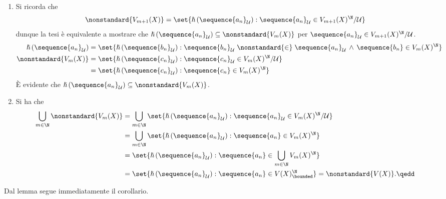 {\begin{enumerate}
        \item Si ricorda che \begin{equation*}
            \nonstandard{V_{m+1}(X) } = \set{\hslash\left(\sequence{a_{n} }_{\mathcal{U}}\right) : \sequence{a_{n} }_{\mathcal{U}} \in V_{m+1}(X)^{\N}/\mathcal{U} }
        \end{equation*}dunque la tesi è equivalente a mostrare che $ \hslash\left(\sequence{a_{n} }_{\mathcal{U}}\right) \subseteq \nonstandard{V_{m}(X) } $ per $ \sequence{a_{n} }_{\mathcal{U}} \in V_{m+1}(X)^{\N}/\mathcal{U} $.\begin{align*}
            \hslash\left(\sequence{a_{n} }_{\mathcal{U}}\right) &= \set{\hslash \left(\sequence{b_{n} }_{\mathcal{U}}\right): \sequence{b_{n} }_{\mathcal{U}} \mathrel{\nonstandard{\in}}\sequence{a_{n} }_{\mathcal{U}} \,\land\, \sequence{b_{n} } \in V_{m}(X)^{\N} }\\ 
            \nonstandard{V_{m}(X) } &= \set{\hslash\left(\sequence{c_{n} }_{\mathcal{U}}\right): \sequence{c_{n} }_{\mathcal{U}} \in V_{m}(X)^{\N}/\mathcal{U} }\\ 
            &=\set{\hslash\left(\sequence{c_{n} }_{\mathcal{U}}\right): \sequence{c_{n} } \in V_{m}(X)^{\N} }
        \end{align*}È evidente che $ \hslash\left(\sequence{a_{n} }_{\mathcal{U}}\right) \subseteq \nonstandard{V_{m}(X) } $.
        \item Si ha che \begin{align*}
            \bigcup_{m \in \N} \nonstandard{V_{m}(X) } &= \bigcup_{m \in \N} \set{\hslash\left(\sequence{a_{n}}_{\mathcal{U}}\right): \sequence{a_{n}}_{\mathcal{U}} \in V_{m}(X)^{\N}/\mathcal{U} }\\ 
            &=\bigcup_{m \in \N} \set{\hslash\left(\sequence{a_{n}}_{\mathcal{U}}\right): \sequence{a_{n}}\in V_{m}(X)^{\N} }\\ 
            &= \set{\hslash\left(\sequence{a_{n}}_{\mathcal{U}}\right): \sequence{a_{n}}\in \bigcup_{m \in \N} V_{m}(X)^{\N} }\\ 
            &=\set{\hslash\left(\sequence{a_{n}}_{\mathcal{U}}\right): \sequence{a_{n}}\in V(X)^{\N}_{\bounded} } = \nonstandard{V(X)}.\qedd
        \end{align*}
    \end{enumerate}
}

Dal lemma  segue immediatamente il corollario.


